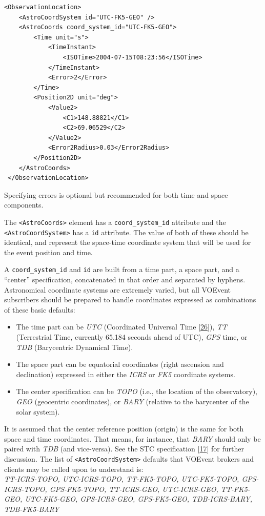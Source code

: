 \documentclass[11pt,a4paper]{ivoa}
\begin{document}
{\footnotesize
\begin{verbatim}
<ObservationLocation>
    <AstroCoordSystem id="UTC-FK5-GEO" />
    <AstroCoords coord_system_id="UTC-FK5-GEO">
        <Time unit="s">
            <TimeInstant>
                <ISOTime>2004-07-15T08:23:56</ISOTime>
            </TimeInstant>
            <Error>2</Error>
        </Time>
        <Position2D unit="deg">
            <Value2>
                <C1>148.88821</C1>
                <C2>69.06529</C2>
            </Value2>
            <Error2Radius>0.03</Error2Radius>
        </Position2D>
    </AstroCoords>
 </ObservationLocation> 
\end{verbatim}}

Specifying errors is optional but recommended for both time and space components. 

The {\tt <AstroCoords>} element has a {\tt coord\_system\_id} attribute and the {\tt <AstroCoordSystem>} has a {\tt id} attribute. The value of both of these should be identical, and represent the space-time coordinate system that will be used for the event position and time. 

A {\tt coord\_system\_id} and {\tt id} are built from a time part, a space part, and a ``center'' specification, concatenated in that order and separated by hyphens. Astronomical coordinate systems are extremely varied, but all VOEvent subscribers should be prepared to handle coordinates expressed as combinations of these basic defaults: 
\begin{itemize}
\item The time part can be \emph{UTC} (Coordinated Universal Time [\hyperref[bib26]{26}]), \emph{TT} (Terrestrial Time, currently 65.184 seconds ahead of UTC), \emph{GPS} time, or \emph{TDB} (Barycentric Dynamical Time). 
\item The space part can be equatorial coordinates (right ascension and declination) expressed in either the \emph{ICRS} or \emph{FK5} coordinate systems. 
\item The center specification can be \emph{TOPO} (i.e., the location of the observatory), \emph{GEO} (geocentric coordinates), or \emph{BARY} (relative to the barycenter of the solar system). 
\end{itemize}


It is assumed that the center reference position (origin) is the same for both space and time coordinates. That means, for instance, that \emph{BARY} should only be paired with \emph{TDB} (and vice-versa). See the STC specification [\hyperref[bib17]{17}]
for further discussion. The list of {\tt <AstroCoordSystem>} defaults that VOEvent brokers and clients may be called upon to understand is: \\
\emph{TT-ICRS-TOPO, UTC-ICRS-TOPO, TT-FK5-TOPO, UTC-FK5-TOPO, GPS-ICRS-TOPO, GPS-FK5-TOPO, TT-ICRS-GEO, UTC-ICRS-GEO, TT-FK5-GEO, UTC-FK5-GEO, GPS-ICRS-GEO, GPS-FK5-GEO, TDB-ICRS-BARY, TDB-FK5-BARY}
\end{document}
